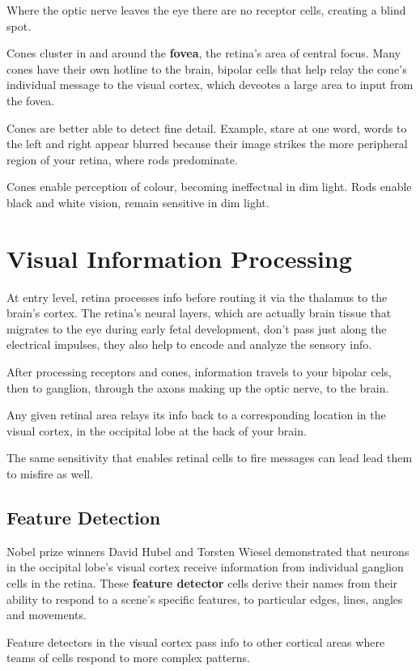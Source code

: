 \documentclass[12pt]{article}
\begin{document}
Where the optic nerve leaves the eye there are no receptor cells, creating a blind spot.

Cones cluster in and around the \textbf{fovea}, the retina's area of central focus. Many cones have their own hotline to the brain, bipolar cells that help relay the cone's individual message to the visual cortex, which deveotes a large area to input from the fovea.

Cones are better able to detect fine detail. Example, stare at one word, words to the left and right appear blurred because their image strikes the more peripheral region of your retina, where rods predominate. 

Cones enable perception of colour, becoming ineffectual in dim light. Rods enable black and white vision, remain sensitive in dim light. 

\section{Visual Information Processing}
At entry level, retina processes info before routing it via the thalamus to the brain's cortex. The retina's neural layers, which are actually brain tissue that migrates to the eye during early fetal development, don't pass just along the electrical impulses, they also help to encode and analyze the sensory info. 

After processing receptors and cones, information travels to your bipolar cels, then to ganglion, through the axons making up the optic nerve, to the brain.

Any given retinal area relays its info back to a corresponding location in the visual cortex, in the occipital lobe at the back of your brain. 

The same sensitivity that enables retinal cells to fire messages can lead lead them to misfire as well.

\subsection*{Feature Detection}
Nobel prize winners David Hubel and Torsten Wiesel demonstrated that neurons in the occipital lobe's visual cortex receive information from individual ganglion cells in the retina. These \textbf{feature detector} cells derive their names from their ability to respond to a scene's specific features, to particular edges, lines, angles and movements.

Feature detectors in the visual cortex pass info to other cortical areas where teams of cells respond to more complex patterns. 
\end{document}
